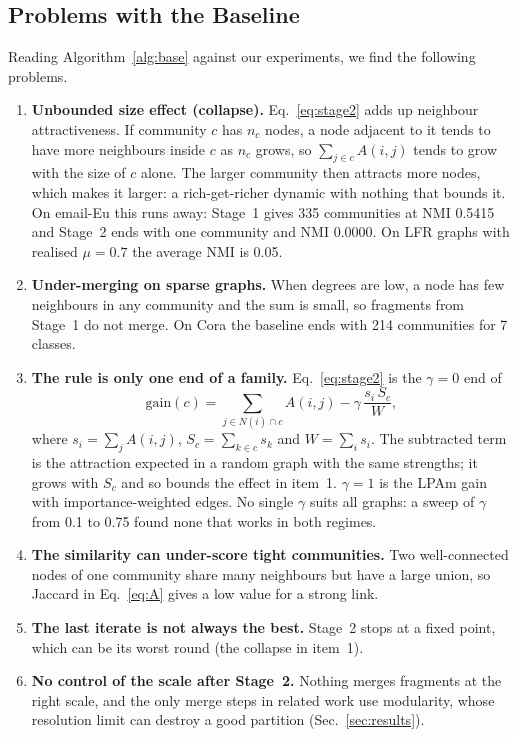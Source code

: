 \documentclass[conference]{IEEEtran}
\begin{document}
\subsection{Problems with the Baseline}\label{sec:problem}
Reading Algorithm~\ref{alg:base} against our experiments, we find the following problems.
\begin{enumerate}
\item \textbf{Unbounded size effect (collapse).} Eq.~\eqref{eq:stage2} adds up neighbour attractiveness. If community $c$ has $n_c$ nodes, a node adjacent to it tends to have more neighbours inside $c$ as $n_c$ grows, so $\sum_{j\in c}A(i,j)$ tends to grow with the size of $c$ alone. The larger community then attracts more nodes, which makes it larger: a rich-get-richer dynamic with nothing that bounds it. On email-Eu this runs away: Stage~1 gives 335 communities at NMI 0.5415 and Stage~2 ends with one community and NMI 0.0000. On LFR graphs with realised $\mu=0.7$ the average NMI is 0.05.
\item \textbf{Under-merging on sparse graphs.} When degrees are low, a node has few neighbours in any community and the sum is small, so fragments from Stage~1 do not merge. On Cora the baseline ends with 214 communities for 7 classes.
\item \textbf{The rule is only one end of a family.} Eq.~\eqref{eq:stage2} is the $\gamma=0$ end of
\begin{equation}
\mathrm{gain}(c)=\sum_{j\in N(i)\cap c}A(i,j)-\gamma\,\frac{s_i\,S_c}{W},\label{eq:gain}
\end{equation}
where $s_i=\sum_jA(i,j)$, $S_c=\sum_{k\in c}s_k$ and $W=\sum_is_i$. The subtracted term is the attraction expected in a random graph with the same strengths; it grows with $S_c$ and so bounds the effect in item~1. $\gamma=1$ is the LPAm gain~\cite{barber2009} with importance-weighted edges. No single $\gamma$ suits all graphs: a sweep of $\gamma$ from 0.1 to 0.75 found none that works in both regimes.
\item \textbf{The similarity can under-score tight communities.} Two well-connected nodes of one community share many neighbours but have a large union, so Jaccard in Eq.~\eqref{eq:A} gives a low value for a strong link.
\item \textbf{The last iterate is not always the best.} Stage~2 stops at a fixed point, which can be its worst round (the collapse in item~1).
\item \textbf{No control of the scale after Stage~2.} Nothing merges fragments at the right scale, and the only merge steps in related work use modularity, whose resolution limit can destroy a good partition (Sec.~\ref{sec:results}).

\end{enumerate}
\end{document}
